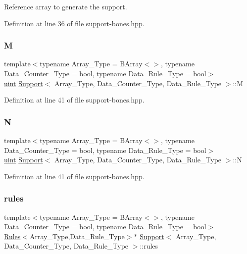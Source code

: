 Reference array to generate the support. 



Definition at line 36 of file support-\/bones.\+hpp.

\mbox{\label{class_support_ac0662129b0a12fe4eac69f6f2e733b05}} 
\subsubsection{\texorpdfstring{M}{M}}
{\footnotesize\ttfamily template$<$typename Array\+\_\+\+Type = B\+Array$<$$>$, typename Data\+\_\+\+Counter\+\_\+\+Type = bool, typename Data\+\_\+\+Rule\+\_\+\+Type = bool$>$ \\
\hyperlink{typedefs_8hpp_a91ad9478d81a7aaf2593e8d9c3d06a14}{uint} \hyperlink{class_support}{Support}$<$ Array\+\_\+\+Type, Data\+\_\+\+Counter\+\_\+\+Type, Data\+\_\+\+Rule\+\_\+\+Type $>$\+::M}



Definition at line 41 of file support-\/bones.\+hpp.

\mbox{\label{class_support_a6c6f707fae03f409c556b6d4668617af}} 
\subsubsection{\texorpdfstring{N}{N}}
{\footnotesize\ttfamily template$<$typename Array\+\_\+\+Type = B\+Array$<$$>$, typename Data\+\_\+\+Counter\+\_\+\+Type = bool, typename Data\+\_\+\+Rule\+\_\+\+Type = bool$>$ \\
\hyperlink{typedefs_8hpp_a91ad9478d81a7aaf2593e8d9c3d06a14}{uint} \hyperlink{class_support}{Support}$<$ Array\+\_\+\+Type, Data\+\_\+\+Counter\+\_\+\+Type, Data\+\_\+\+Rule\+\_\+\+Type $>$\+::N}



Definition at line 41 of file support-\/bones.\+hpp.

\mbox{\label{class_support_a6fc8b2206c3755acbd26d9439e100f3d}} 
\subsubsection{\texorpdfstring{rules}{rules}}
{\footnotesize\ttfamily template$<$typename Array\+\_\+\+Type = B\+Array$<$$>$, typename Data\+\_\+\+Counter\+\_\+\+Type = bool, typename Data\+\_\+\+Rule\+\_\+\+Type = bool$>$ \\
\hyperlink{class_rules}{Rules}$<$Array\+\_\+\+Type,Data\+\_\+\+Rule\+\_\+\+Type$>$$\ast$ \hyperlink{class_support}{Support}$<$ Array\+\_\+\+Type, Data\+\_\+\+Counter\+\_\+\+Type, Data\+\_\+\+Rule\+\_\+\+Type $>$\+::rules}




